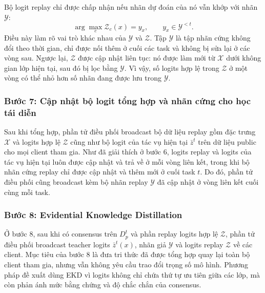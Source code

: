 Bộ logit replay chỉ được chấp nhận nếu nhãn dự đoán của nó vẫn khớp với nhãn $\mathcal Y$:
\begin{equation}
\label{eq:replay_consistency}
\arg\max_c\mathcal Z_c(x)=y_x,\qquad y_x\in\mathcal Y^{<t}.
\end{equation}
Điều này làm rõ vai trò khác nhau của $\mathcal Y$ và $\mathcal Z$. Tập $\mathcal Y$ là tập nhãn cứng không đổi theo thời gian, chỉ được nối thêm ở cuối các task và không bị sửa lại ở các vòng sau. Ngược lại, $\mathcal Z$ được cập nhật liên tục: nó được làm mới từ $\mathcal X$ dưới không gian lớp hiện tại, sau đó bị lọc bằng $\mathcal Y$. Vì vậy, số logits hợp lệ trong $\mathcal Z$ ở một vòng có thể nhỏ hơn số nhãn đang được lưu trong $\mathcal Y$.

\subsubsection{Bước 7: Cập nhật bộ logit tổng hợp và nhãn cứng cho học tái diễn}

Sau khi tổng hợp, phần tử điều phối broadcast bộ dữ liệu replay gồm đặc trưng $\mathcal X$ và logits hợp lệ $\mathcal Z$ cũng như bộ logit của tác vụ hiện tại $\bar z^t$ trên dữ liệu public cho mọi client tham gia. Như đã giải thích ở bước 6, logits replay và logits của tác vụ hiện tại luôn được cập nhật và trả về ở mỗi vòng liên kết, trong khi bộ nhãn cứng replay chỉ được cập nhật và thêm mới ở cuối task $t$. Do đó, phần tử điều phối cũng broadcast kèm bộ nhãn replay $\mathcal Y$ đã cập nhật ở vòng liên kết cuối cùng mỗi task.

\subsubsection{Bước 8: Evidential Knowledge Distillation}

Ở bước 8, sau khi có consensus trên $D_p^t$ và phần replay logits hợp lệ $\mathcal Z$, phần tử điều phối broadcast teacher logits $\bar z^t(x)$, nhãn giả $\mathcal Y$ và logits replay $\mathcal Z$ về các client. Mục tiêu của bước 8 là đưa tri thức đã được tổng hợp quay lại toàn bộ client tham gia, nhưng vẫn không yêu cầu trao đổi trọng số mô hình. Phương pháp đề xuất dùng EKD vì logits không chỉ chứa thứ tự ưu tiên giữa các lớp, mà còn phản ánh mức bằng chứng và độ chắc chắn của consensus.

